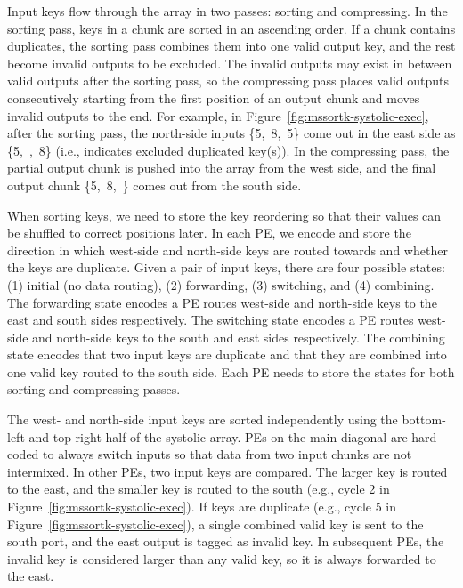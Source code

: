 Input keys flow through the array in two passes: sorting and compressing.
In the sorting pass, keys in a chunk are sorted in an ascending order.
If a chunk contains duplicates, the sorting pass combines them into one valid
output key, and the rest become invalid outputs to be excluded.
The invalid outputs may exist in between valid outputs after the sorting pass,
so the compressing pass places valid outputs consecutively starting from the
first position of an output chunk and moves invalid outputs to the end.
For example, in Figure~\ref{fig:mssortk-systolic-exec}, after the sorting pass,
the north-side inputs \{5,~8,~5\} come out in the east side as \{5,~,~8\}
(i.e.,  indicates excluded duplicated key(s)).
In the compressing pass, the partial output chunk is pushed into the array from
the west side, and the final output chunk \{5,~8,~\} comes out from the
south side.

When sorting keys, we need to store the key reordering so that their values can
be shuffled to correct positions later.
In each PE, we encode and store the direction in which west-side and north-side
keys are routed towards and whether the keys are duplicate.
Given a pair of input keys, there are four possible states: (1) initial (no
data routing), (2) forwarding, (3) switching, and (4) combining.
The forwarding state encodes a PE routes west-side and north-side keys to the
east and south sides respectively.
The switching state encodes a PE routes west-side and north-side keys to the
south and east sides respectively.
The combining state encodes that two input keys are duplicate and that they are
combined into one valid key routed to the south side.
Each PE needs to store the states for both sorting and compressing passes.

The west- and north-side input keys are sorted independently using the
bottom-left and top-right half of the systolic array.
PEs on the main diagonal are hard-coded to always switch inputs so that data
from two input chunks are not intermixed.
In other PEs, two input keys are compared.
The larger key is routed to the east, and the smaller key is routed to the
south (e.g., cycle 2 in Figure~\ref{fig:mssortk-systolic-exec}).
If keys are duplicate (e.g., cycle 5 in
Figure~\ref{fig:mssortk-systolic-exec}), a single combined valid key is sent to
the south port, and the east output is tagged as invalid key.
In subsequent PEs, the invalid key is considered larger than any valid key, so
it is always forwarded to the east.

